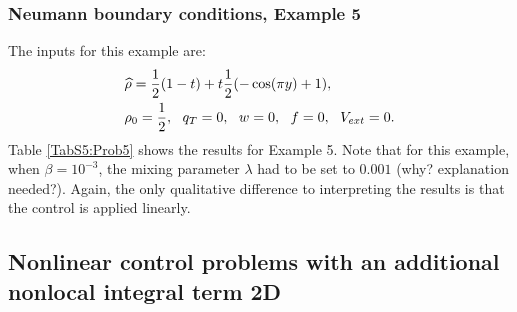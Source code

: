 \subsubsection{Neumann boundary conditions, Example 5}
The inputs for this example are:
\begin{align*}
&\widehat \rho = \frac{1}{2}(1-t) + t\frac{1}{2}(-\cos(\pi y) + 1),\\
&\rho_{0} = \frac{1}{2},\ \
q_{T} = 0,\ \
{w} = 0,\ \
f =0,\ \
V_{ext} =0.
\end{align*}
Table \ref{TabS5:Prob5} shows the results for Example 5. Note that for this example, when $\beta = 10^{-3}$, the mixing parameter $\lambda$ had to be set to $0.001$ (why? explanation needed?).
Again, the only qualitative difference to interpreting the results is that the control is applied linearly.


\subsection{Nonlinear control problems with an additional nonlocal integral term 2D}

